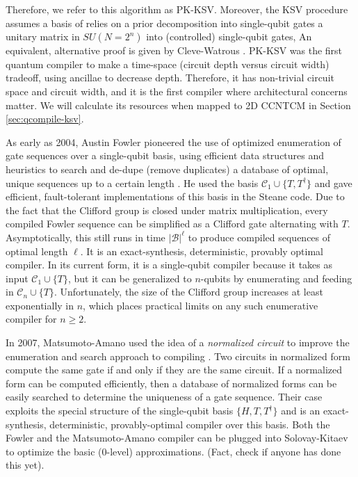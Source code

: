 Therefore, we
refer to this algorithm as PK-KSV.
Moreover, the KSV procedure assumes a basis of
relies on a prior decomposition into
single-qubit gates
a unitary matrix in $SU(N=2^n)$ into (controlled) single-qubit gates,
An equivalent, alternative proof is given by Cleve-Watrous \cite{Cleve2000}.
PK-KSV was the first quantum compiler to make a time-space (circuit depth
versus circuit width) tradeoff,
using ancillae to decrease depth. Therefore, it has non-trivial circuit space
and circuit width, and it is the first compiler where architectural concerns
matter.
We will calculate its resources when mapped to
\textsf{2D CCNTCM} in Section \ref{sec:qcompile-ksv}.


As early as 2004, Austin Fowler pioneered the use of optimized enumeration
of gate sequences over a single-qubit basis, using efficient data structures
and heuristics to search and de-dupe (remove duplicates) a database of optimal, unique
sequences up to
a certain length \cite{Fowler2011}. He used the basis $\mathcal{C}_1 \cup \{ T, T^{\dagger} \}$
and gave efficient, fault-tolerant implementations of this basis in the
Steane code. Due to the fact that the Clifford group is closed under
matrix multiplication, every compiled Fowler sequence can be simplified as a
Clifford gate alternating with $T$. Asymptotically, this still runs in time
$|\mathcal{B}|^\ell$ to produce compiled sequences of optimal length $\ell$.
It is an exact-synthesis, deterministic, provably optimal compiler.
In its current form, it is a single-qubit compiler because it takes as input
$\mathcal{C}_1 \cup \{T\}$, but it can be generalized to $n$-qubits by enumerating
and feeding in $\mathcal{C}_n \cup \{T\}$. Unfortunately, the size of the
Clifford group increases at least exponentially in $n$, which places practical
limits on any such enumerative compiler for $n \ge 2$.

In 2007, Matsumoto-Amano used the idea of a \emph{normalized circuit} to
improve the enumeration and search approach to compiling \cite{Matsumoto2008}. Two circuits in
normalized form compute the same gate if and only if they are the same
circuit. If a normalized form can be computed efficiently, then a
database of normalized forms can be easily searched to determine the
uniqueness of a gate sequence. Their case exploits the special structure
of the single-qubit basis $\{H,T,T^{\dagger}\}$ and is an exact-synthesis,
deterministic, provably-optimal compiler over this basis. Both the Fowler
and the Matsumoto-Amano compiler can be plugged into Solovay-Kitaev to
optimize the basic (0-level) approximations. (Fact, check if anyone
has done this yet).

